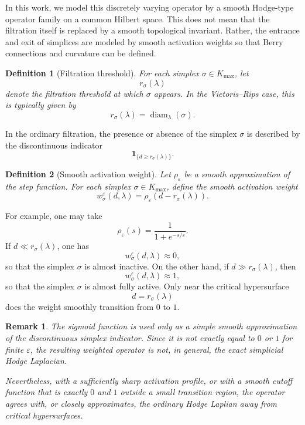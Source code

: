 \documentclass[pdflatex,sn-mathphys-num]{sn-jnl}%
\theoremstyle{thmstyleone}%
\theoremstyle{thmstyletwo}%
\newtheorem{remark}{Remark}%
\theoremstyle{thmstylethree}%
\newtheorem{definition}{Definition}%
\begin{document}
In this work, we model this discretely varying operator by a smooth Hodge-type
operator family on a common Hilbert space. This does not mean that the filtration
itself is replaced by a smooth topological invariant. Rather, the entrance and
exit of simplices are modeled by smooth activation weights so that Berry
connections and curvature can be defined.


\begin{definition}[Filtration threshold]
For each simplex \(\sigma\in K_{\max}\), let
\[
r_\sigma(\lambda)
\]
denote the filtration threshold at which \(\sigma\) appears. In the
Vietoris--Rips case, this is typically given by
\[
r_\sigma(\lambda)=\operatorname{diam}_\lambda(\sigma).
\]
\end{definition}

In the ordinary filtration, the presence or absence of the simplex \(\sigma\) is
described by the discontinuous indicator
\[
\mathbf 1_{\{d\ge r_\sigma(\lambda)\}}.
\]

\begin{definition}[Smooth activation weight]
Let \(\rho_\varepsilon\) be a smooth approximation of the step function. 
For each simplex \(\sigma\in K_{\max}\), define the smooth activation weight
\[
w_\sigma^\varepsilon(d,\lambda)
=
\rho_\varepsilon(d-r_\sigma(\lambda)).
\]
\end{definition}

For example, one may take
\[
\rho_\varepsilon(s)
=
\frac{1}{1+e^{-s/\varepsilon}}.
\]
If \(d\ll r_\sigma(\lambda)\), one has
\[
w_\sigma^\varepsilon(d,\lambda)\approx 0,
\]
so that the simplex \(\sigma\) is almost inactive. On the other hand, if
\(d\gg r_\sigma(\lambda)\), then
\[
w_\sigma^\varepsilon(d,\lambda)\approx 1,
\]
so that the simplex \(\sigma\) is almost fully active. Only near the critical
hypersurface
\[
d=r_\sigma(\lambda)
\]
does the weight smoothly transition from \(0\) to \(1\).

\begin{remark}
The sigmoid function is used only as a simple smooth approximation of the
discontinuous simplex indicator. Since it is not exactly equal to \(0\) or \(1\)
for finite \(\varepsilon\), the resulting weighted operator is not, in general,
the exact simplicial Hodge Laplacian.

Nevertheless, with a sufficiently sharp activation profile, or with a smooth
cutoff function that is exactly \(0\) and \(1\) outside a small transition
region, the operator agrees with, or closely approximates, the ordinary Hodge
Laplian away from critical hypersurfaces.
\end{remark}
\end{document}
